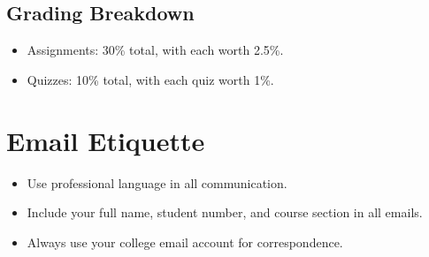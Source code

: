 \documentclass{article}
\begin{document}
\subsection{Grading Breakdown}
\begin{itemize}
    \item Assignments: 30\% total, with each worth 2.5\%.
    \item Quizzes: 10\% total, with each quiz worth 1\%.
\end{itemize}

\section{Email Etiquette}
\begin{itemize}
    \item Use professional language in all communication.
    \item Include your full name, student number, and course section in all emails.
    \item Always use your college email account for correspondence.
\end{itemize}
\end{document}
